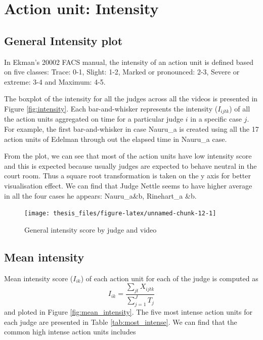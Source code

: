 \documentclass{monashthesis}
\begin{document}
\hypertarget{action-unit-intensity}{%
\section{Action unit: Intensity}\label{action-unit-intensity}}

\hypertarget{general-intensity-plot}{%
\subsection{General Intensity plot}\label{general-intensity-plot}}

In Ekman's 20002 FACS manual, the intensity of an action unit is defined based on five classes: Trace: 0-1, Slight: 1-2, Marked or pronounced: 2-3, Severe or extreme: 3-4 and Maximum: 4-5.

The boxplot of the intensity for all the judges across all the videos is presented in Figure \ref{fig:intensity}. Each bar-and-whisker represents the intensity (\(I_{ijtk}\)) of all the action units aggregated on time for a particular judge \(i\) in a specific case \(j\). For example, the first bar-and-whisker in case Nauru\_a is created using all the 17 action units of Edelman through out the elapsed time in Nauru\_a case.

From the plot, we can see that most of the action units have low intensity score and this is expected because usually judges are expected to behave neutral in the court room. Thus a square root transformation is taken on the y axis for better visualisation effect. We can find that Judge Nettle seems to have higher average in all the four cases he appears: Nauru\_a\&b, Rinehart\_a \&b.

\begin{figure}
\texttt{[image: thesis\_files/figure-latex/unnamed-chunk-12-1]} \caption{General intensity score by judge and video\label{fig:intensity}}\label{fig:unnamed-chunk-12}
\end{figure}

\hypertarget{mean-intensity}{%
\subsection{Mean intensity}\label{mean-intensity}}

Mean intensity score (\(I_{ik}\)) of each action unit for each of the judge is computed as \[I_{ik} = \frac{\sum_{jt}X_{ijtk}}{\sum_{j = 1}^JT_j}\] and ploted in Figure \ref{fig:mean_intensity}. The five most intense action units for each judge are presented in Table \ref{tab:most_intense}. We can find that the common high intense action units includes
\end{document}
